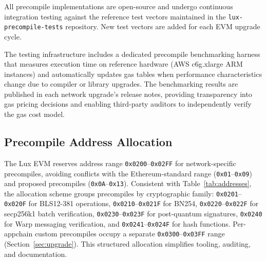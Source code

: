 All precompile implementations are open-source and undergo continuous integration testing against the reference test vectors maintained in the \texttt{lux-precompile-tests} repository. New test vectors are added for each EVM upgrade cycle.

The testing infrastructure includes a dedicated precompile benchmarking harness that measures execution time on reference hardware (AWS c6g.xlarge ARM instances) and automatically updates gas tables when performance characteristics change due to compiler or library upgrades. The benchmarking results are published in each network upgrade's release notes, providing transparency into gas pricing decisions and enabling third-party auditors to independently verify the gas cost model.

\subsection{Precompile Address Allocation}

The Lux EVM reserves address range \texttt{0x0200}--\texttt{0x02FF} for network-specific precompiles, avoiding conflicts with the Ethereum-standard range (\texttt{0x01}--\texttt{0x09}) and proposed precompiles (\texttt{0x0A}--\texttt{0x13}). Consistent with Table~\ref{tab:addresses}, the allocation scheme groups precompiles by cryptographic family: \texttt{0x0201}--\texttt{0x020F} for BLS12-381 operations, \texttt{0x0210}--\texttt{0x021F} for BN254, \texttt{0x0220}--\texttt{0x022F} for secp256k1 batch verification, \texttt{0x0230}--\texttt{0x023F} for post-quantum signatures, \texttt{0x0240} for Warp messaging verification, and \texttt{0x0241}--\texttt{0x024F} for hash functions. Per-appchain custom precompiles occupy a separate \texttt{0x0300}--\texttt{0x03FF} range (Section~\ref{sec:upgrade}). This structured allocation simplifies tooling, auditing, and documentation.

